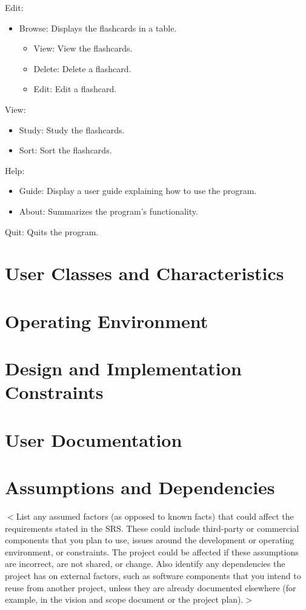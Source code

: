 \documentclass{scrreprt}
\begin{document}
Edit:
\begin{itemize}
    \item Browse: Displays the flashcards in a table.
    \begin{itemize}
        \item View: View the flashcards.
        \item Delete: Delete a flashcard.
        \item Edit: Edit a flashcard.
    \end{itemize}
\end{itemize}

View:
\begin{itemize}
    \item Study: Study the flashcards.
    \item Sort: Sort the flashcards.
\end{itemize}

Help:
\begin{itemize}
    \item Guide: Display a user guide explaining how to use the program.
    \item About: Summarizes the program's functionality.
\end{itemize}

Quit: Quits the program.

\section{User Classes and Characteristics}

\section{Operating Environment}

\section{Design and Implementation Constraints}

\section{User Documentation}

\section{Assumptions and Dependencies}

$<$List any assumed factors (as opposed to known facts) that could affect the 
requirements stated in the SRS. These could include third-party or commercial 
components that you plan to use, issues around the development or operating 
environment, or constraints. The project could be affected if these assumptions 
are incorrect, are not shared, or change. Also identify any dependencies the 
project has on external factors, such as software components that you intend to 
reuse from another project, unless they are already documented elsewhere (for 
example, in the vision and scope document or the project plan).$>$
\end{document}
